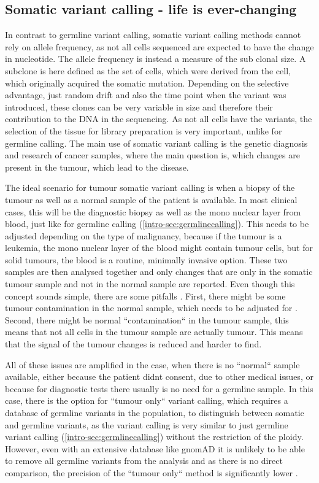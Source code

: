 \subsection[Somatic]{Somatic variant calling - life is ever-changing}
\label{intro-sec:somaticcalling}
In contrast to germline variant calling, somatic variant calling methods cannot rely on allele frequency, as not all cells sequenced are expected to have the change in nucleotide. The allele frequency is instead a measure of the sub clonal size. A subclone is here defined as the set of cells, which were derived from the cell, which originally acquired the somatic mutation. Depending on the selective advantage, just random drift and also the time point when the variant was introduced, these clones can be very variable in size and therefore their contribution to the DNA in the sequencing.
As not all cells have the variants, the selection of the tissue for library preparation is very important, unlike for germline calling. 
The main use of somatic variant calling is the genetic diagnosis and research of cancer samples, where the main question is, which changes are present in the tumour, which lead to the disease.

The ideal scenario for tumour somatic variant calling is when a biopsy of the tumour as well as a normal sample of the patient is available. In most clinical cases, this will be the diagnostic biopsy as well as the mono nuclear layer from blood, just like for germline calling (\autoref{intro-sec:germlinecalling}). This needs to be adjusted depending on the type of malignancy, because if the tumour is a leukemia, the mono nuclear layer of the blood might contain tumour cells, but for solid tumours, the blood is a routine, minimally invasive option.
These two samples are then analysed together and only changes that are only in the somatic tumour sample and not in the normal sample are reported. Even though this concept sounds simple, there are some pitfalls \cite{GATKTeam2021a}. First, there might be some tumour contamination in the normal sample, which needs to be adjusted for \cite{Kim2018,TaylorWeiner2018}. Second, there might be normal ``contamination`` in the tumour sample, this means that not all cells in the tumour sample are actually tumour. This means that the signal of the tumour changes is reduced and harder to find.

All of these issues are amplified in the case, when there is no ``normal`` sample available, either because the patient didnt consent, due to other medical issues, or because for diagnostic tests there usually is no need for a germline sample. In this case, there is the option for ``tumour only`` variant calling, which requires a database of germline variants in the population, to distinguish between somatic and germline variants, as the variant calling is very similar to just germline variant calling (\autoref{intro-sec:germlinecalling}) without the restriction of the ploidy. However, even with an extensive database like gnomAD \cite{Karczewski2020} it is unlikely to be able to remove all germline variants from the analysis and as there is no direct comparison, the precision of the ``tumour only`` method is significantly lower \cite{Karimnezhad2020}.
